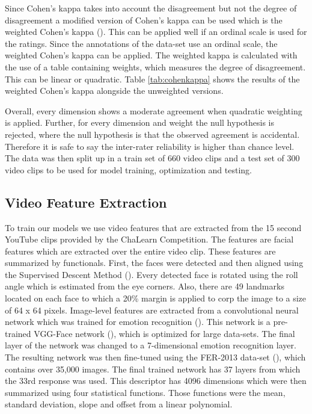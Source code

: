 Since Cohen's kappa takes into account the disagreement but not the degree of disagreement a modified version of Cohen's kappa can be used which is the weighted Cohen's kappa (\cite{cohen1968weighted}). This can be applied well if an ordinal scale is used for the ratings. Since the annotations of the data-set use an ordinal scale, the weighted Cohen's kappa can be applied. The weighted kappa is calculated with the use of a table containing weights, which measures the degree of disagreement. This can be linear or quadratic. Table \ref{tab:cohenkappa} shows the results of the weighted Cohen's kappa alongside the unweighted versions. 

Overall, every dimension shows a moderate agreement when quadratic weighting is applied. Further, for every dimension and weight the null hypothesis is rejected, where the null hypothesis is that the observed agreement is accidental. Therefore it is safe to say the inter-rater reliability is higher than chance level. The data was then split up in a train set of 660 video clips and a test set of 300 video clips to be used for model training, optimization and testing. 

\subsection{Video Feature Extraction}\label{subsection:featureextraction}
To train our models we use video features that are extracted from the 15 second YouTube clips provided by the ChaLearn Competition. The features are facial features which are extracted over the entire video clip. These features are summarized by functionals. First, the faces were detected and then aligned using the Supervised Descent Method (\cite{xiong2013supervised}). Every detected face is rotated using the roll angle which is estimated from the eye corners. Also, there are 49 landmarks located on each face to which a 20\% margin is applied to corp the image to a size of 64 x 64 pixels. Image-level features are extracted from a convolutional neural network which was trained for emotion recognition (\cite{kaya2017video}). This network is a pre-trained VGG-Face network (\cite{parkhi2015deep}), which is optimized for large data-sets. The final layer of the network was changed to a 7-dimensional emotion recognition layer. The resulting network was then fine-tuned using the FER-2013 data-set (\cite{goodfellow2015challenges}), which contains over 35,000 images. The final trained network has 37 layers from which the 33rd response was used. This descriptor has 4096 dimensions which were then summarized using four statistical functions. Those functions were the mean, standard deviation, slope and offset from a linear polynomial.

